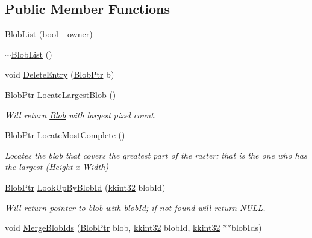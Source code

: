 \subsection*{Public Member Functions}
\begin{DoxyCompactItemize}
\item 
\hyperlink{class_k_k_b_1_1_blob_list_a5651e16a693765b626fb6f1b85700045}{Blob\+List} (bool \+\_\+owner)
\item 
\hyperlink{class_k_k_b_1_1_blob_list_a8bdcfd3ae7ed5bda5ce42192d37b4f25}{$\sim$\+Blob\+List} ()
\item 
void \hyperlink{class_k_k_b_1_1_blob_list_af612dce77d3abecf54f4424b500c42df}{Delete\+Entry} (\hyperlink{namespace_k_k_b_a4fa91a7788b982654fca9d7319b98cb4}{Blob\+Ptr} b)
\item 
\hyperlink{namespace_k_k_b_a4fa91a7788b982654fca9d7319b98cb4}{Blob\+Ptr} \hyperlink{class_k_k_b_1_1_blob_list_a68a45d0c30102a70de2bcd96f3aa48a2}{Locate\+Largest\+Blob} ()
\begin{DoxyCompactList}\small\item\em Will return \hyperlink{class_k_k_b_1_1_blob}{Blob} with largest pixel count. \end{DoxyCompactList}\item 
\hyperlink{namespace_k_k_b_a4fa91a7788b982654fca9d7319b98cb4}{Blob\+Ptr} \hyperlink{class_k_k_b_1_1_blob_list_a484e59309adbbfa4d39a0f08586b3e83}{Locate\+Most\+Complete} ()
\begin{DoxyCompactList}\small\item\em Locates the blob that covers the greatest part of the raster; that is the one who has the largest (Height x Width) \end{DoxyCompactList}\item 
\hyperlink{namespace_k_k_b_a4fa91a7788b982654fca9d7319b98cb4}{Blob\+Ptr} \hyperlink{class_k_k_b_1_1_blob_list_a3acd3cdb0c08780511f2087f72749b91}{Look\+Up\+By\+Blob\+Id} (\hyperlink{namespace_k_k_b_a8fa4952cc84fda1de4bec1fbdd8d5b1b}{kkint32} blob\+Id)
\begin{DoxyCompactList}\small\item\em Will return pointer to blob with \textquotesingle{}blob\+Id\textquotesingle{}; if not found will return N\+U\+LL. \end{DoxyCompactList}\item 
void \hyperlink{class_k_k_b_1_1_blob_list_a542ca9592d04a6c7cf1b56127d1c7b4e}{Merge\+Blob\+Ids} (\hyperlink{namespace_k_k_b_a4fa91a7788b982654fca9d7319b98cb4}{Blob\+Ptr} blob, \hyperlink{namespace_k_k_b_a8fa4952cc84fda1de4bec1fbdd8d5b1b}{kkint32} blob\+Id, \hyperlink{namespace_k_k_b_a8fa4952cc84fda1de4bec1fbdd8d5b1b}{kkint32} $\ast$$\ast$blob\+Ids)
$$
\end{DoxyCompactItemize}
